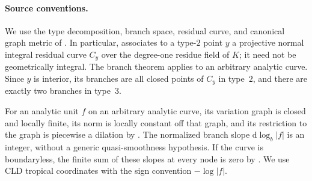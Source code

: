 
\paragraph{Source conventions.}
We use the type decomposition, branch space, residual curve, and canonical
graph metric of \cite[§§3.3--4.5]{Ducros24CurveStructure}.  In
particular, \cite[§3.3.5.2]{Ducros24CurveStructure} associates to a
type-$2$ point $y$ a projective normal integral residual curve $C_y$ over
the degree-one residue field of $K$; it need not be geometrically
integral.  The branch theorem
\cite[Theorem~4.2.10 and §§4.2.11.1--4.2.11.2]
{Ducros24CurveStructure} applies to an arbitrary analytic curve.  Since
$y$ is interior, its branches are all closed points of $C_y$ in type~$2$,
and there are exactly two branches in type~$3$.

For an analytic unit $f$ on an arbitrary analytic curve, its variation
graph is closed and locally finite, its norm is locally constant off that
graph, and its restriction to the graph is piecewise a dilation by
\cite[§§4.5.21.1--4.5.21.4]{Ducros24CurveStructure}.  The normalized
branch slope $\mathrm d\log_b|f|$ is an integer, without a generic
quasi-smoothness hypothesis.  If the curve is boundaryless, the finite
sum of these slopes at every node is zero by
\cite[Theorem~4.5.22]{Ducros24CurveStructure}.  We use CLD tropical
coordinates with the sign convention $-\log|f|$.


